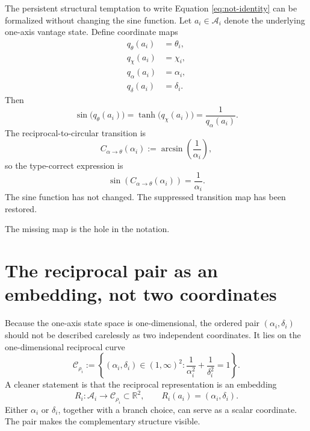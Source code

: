 \documentclass[11pt]{article}
\newcommand{\Aspace}{\mathcal{A}}
\begin{document}
The persistent structural temptation to write Equation
\eqref{eq:not-identity} can be formalized without changing the sine function.
Let $a_i\in\Aspace_i$ denote the underlying one-axis vantage state. Define
coordinate maps
\begin{align}
q_{\theta}(a_i)&=\theta_i,\\
q_{\chi}(a_i)&=\chi_i,\\
q_{\alpha}(a_i)&=\alpha_i,\\
q_{\delta}(a_i)&=\delta_i.
\end{align}
Then
\begin{equation}
\sin\bigl(q_{\theta}(a_i)\bigr)
=
\tanh\bigl(q_{\chi}(a_i)\bigr)
=
\frac{1}{q_{\alpha}(a_i)}.
\label{eq:state-representations}
\end{equation}
The reciprocal-to-circular transition is
\begin{equation}
C_{\alpha\rightarrow\theta}(\alpha_i)
:=
\arcsin\left(\frac{1}{\alpha_i}\right),
\label{eq:coercion}
\end{equation}
so the type-correct expression is
\begin{equation}
\sin\left(
C_{\alpha\rightarrow\theta}(\alpha_i)
\right)
=
\frac{1}{\alpha_i}.
\label{eq:type-correct}
\end{equation}
The sine function has not changed. The suppressed transition map has been
restored.

The missing map is the hole in the notation.

\section{The reciprocal pair as an embedding, not two coordinates}

Because the one-axis state space is one-dimensional, the ordered pair
$(\alpha_i,\delta_i)$ should not be described carelessly as two independent
coordinates. It lies on the one-dimensional reciprocal curve
\begin{equation}
\mathcal{C}_{\rho_i}
:=
\left\{
(\alpha_i,\delta_i)\in(1,\infty)^2:
\frac{1}{\alpha_i^2}
+
\frac{1}{\delta_i^2}
=1
\right\}.
\label{eq:reciprocal-curve}
\end{equation}
A cleaner statement is that the reciprocal representation is an embedding
\begin{equation}
R_i:\Aspace_i\rightarrow\mathcal{C}_{\rho_i}
\subset\mathbb{R}^2,
\qquad
R_i(a_i)=(\alpha_i,\delta_i).
\label{eq:reciprocal-embedding}
\end{equation}
Either $\alpha_i$ or $\delta_i$, together with a branch choice, can serve as
a scalar coordinate. The pair makes the complementary structure visible.
\end{document}
